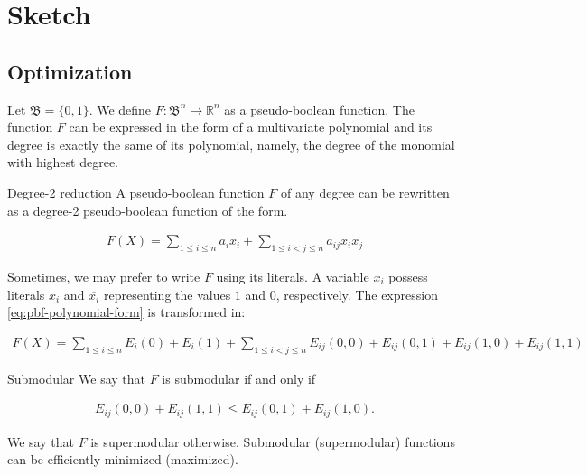 \chapter{Sketch}\label{chapter:appendix-sketch}

\section{Optimization}

Let $\mathfrak{B}=\{0,1\}$. We define $F:\mathfrak{B}^n\rightarrow \mathbb{R}^n$ as a pseudo-boolean function. The function $F$ can be expressed in the form of a multivariate polynomial and its degree is exactly the same of its polynomial, namely, the degree of the monomial with highest degree.

\begin{claim}{Degree-2 reduction}
	A pseudo-boolean function $F$ of any degree can be rewritten as a degree-2 pseudo-boolean function of the form.	
	
\begin{align}\label{eq:pbf-polynomial-form}
	F(X) = \sum_{1\leq i\leq n}{a_ix_i} + \sum_{1 \leq i < j \leq n}{a_{ij}x_ix_j}	
\end{align}	
	
\end{claim}

Sometimes, we may prefer to write $F$ using its literals. A variable $x_i$ possess literals $x_i$ and $\overline{x_i}$ representing the values $1$ and $0$, respectively. The expression \eqref{eq:pbf-polynomial-form} is transformed in:

\begin{align}
	F(X) = \sum_{1\leq i\leq n}{E_i(0) + E_i(1)} + \sum_{1 \leq i < j \leq n}{E_{ij}(0,0) + E_{ij}(0,1) + E_{ij}(1,0) + E_{ij}(1,1)}
\end{align}


\begin{claim}{Submodular} \label{claim:submodular}
 We say that $F$ is submodular if and only if 
 
 \begin{align*}
	E_{ij}(0,0) + E_{ij}(1,1) \leq E_{ij}(0,1) + E_{ij}(1,0).
 \end{align*}
\end{claim}

We say that $F$ is supermodular otherwise. Submodular (supermodular) functions can be efficiently minimized (maximized).

%
%


